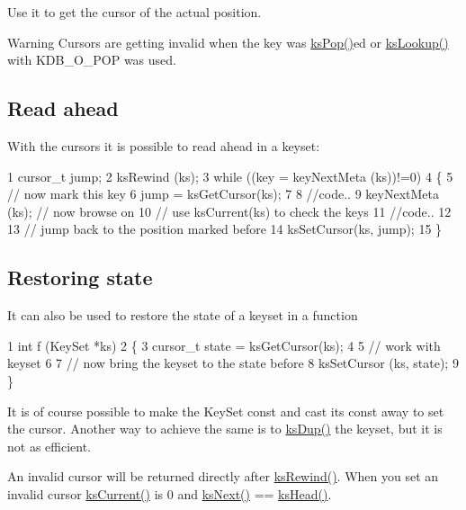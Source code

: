 Use it to get the cursor of the actual position.

\begin{DoxyWarning}{Warning}
Cursors are getting invalid when the key was \hyperlink{group__keyset_gae42530b04defb772059de0600159cf69}{ks\+Pop()}ed or \hyperlink{group__keyset_gaa34fc43a081e6b01e4120daa6c112004}{ks\+Lookup()} with K\+D\+B\+\_\+\+O\+\_\+\+P\+O\+P was used.
\end{DoxyWarning}
\hypertarget{group__keyset_readahead}{}\subsection{Read ahead}\label{group__keyset_readahead}
With the cursors it is possible to read ahead in a keyset\+:


\begin{DoxyCode}
1 cursor\_t jump;
2 ksRewind (ks);
3 while ((key = keyNextMeta (ks))!=0)
4 \{
5         // now mark this key
6         jump = ksGetCursor(ks);
7 
8         //code..
9         keyNextMeta (ks); // now browse on
10         // use ksCurrent(ks) to check the keys
11         //code..
12 
13         // jump back to the position marked before
14         ksSetCursor(ks, jump);
15 \}
\end{DoxyCode}
\hypertarget{group__keyset_restore}{}\subsection{Restoring state}\label{group__keyset_restore}
It can also be used to restore the state of a keyset in a function


\begin{DoxyCode}
1 int f (KeySet *ks)
2 \{
3         cursor\_t state = ksGetCursor(ks);
4 
5         // work with keyset
6 
7         // now bring the keyset to the state before
8         ksSetCursor (ks, state);
9 \}
\end{DoxyCode}


It is of course possible to make the Key\+Set const and cast its const away to set the cursor. Another way to achieve the same is to \hyperlink{group__keyset_gac59e4b328245463f1451f68d5106151c}{ks\+Dup()} the keyset, but it is not as efficient.

An invalid cursor will be returned directly after \hyperlink{group__keyset_gabe793ff51f1728e3429c84a8a9086b70}{ks\+Rewind()}. When you set an invalid cursor \hyperlink{group__keyset_ga4287b9416912c5f2ab9c195cb74fb094}{ks\+Current()} is 0 and \hyperlink{group__keyset_ga317321c9065b5a4b3e33fe1c399bcec9}{ks\+Next()} == \hyperlink{group__keyset_gae7dbf3aef70e67b5328475eb3d1f92f5}{ks\+Head()}.


